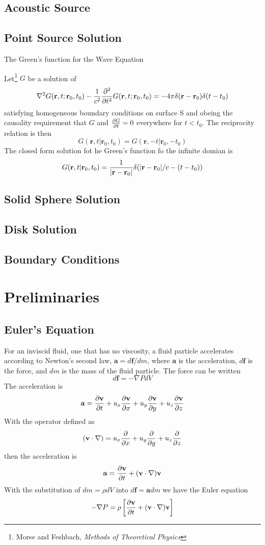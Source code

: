 \documentclass{article}
\begin{document}
\subsection{Acoustic Source}
\subsection{Point Source Solution}
The Green's function for the Wave Equation

Let\footnote{Morse and Feshbach, \textit{Methods of Theoretical Physics}}
$G$ be a solution of
$$
\nabla^2G(\mathbf{r},t; \mathbf{r}_0,t_0)-{1\over c^2}{\partial^2\over\partial t^2}G(\mathbf{r},t; \mathbf{r}_0,t_0)= -4\pi\delta(\mathbf{r}-\mathbf{r}_0)\delta(t-t_0)
$$
satisfying homogeneous boundary conditions on surface S and obeing the causality requirement that $G$ and 
${\partial G\over\partial t}=0$ everywhere for $t<t_0$.  The reciprocity relation is
then
$$
G(\mathbf{r},t\vert\mathbf{r}_0,t_0) = G(\mathbf{r},-t\vert\mathbf{r}_0,-t_0)
$$
The closed form solution fot he Green's function fo the infinite domian is
$$
G(\mathbf{r},t\vert\mathbf{r}_0,t_0) = {1\over \vert\mathbf{r}-\mathbf{r}_0\vert}\delta(\vert\mathbf{r}-\mathbf{r}_0\vert/c - (t-t_0))
$$

\subsection{Solid Sphere Solution}
\subsection{Disk Solution}
\subsection{Boundary Conditions}

\section{Preliminaries}
\subsection{Euler's Equation}
For an inviscid fluid, one that has no viscosity, a fluid particle
accelerates according to Newton's second law,
$\mathbf{a}=d\mathbf{f}/dm$, where $\mathbf{a}$ is the acceleration,
$d\mathbf{f}$ is the force, and $dm$ is the mass of the fluid particle. 
The force can be written
$$
d\mathbf{f}=-\nabla P dV
$$
The acceleration is
$$
\mathbf{a}={\partial \mathbf{v}\over \partial t} + u_x{\partial \mathbf{v}\over \partial x} + u_y\frac{\partial
\mathbf{v}}{\partial y} + u_z{\partial \mathbf{v}\over \partial z}
$$
With the operator defined as
$$
(\mathbf{v} \cdot \nabla) = u_x{\partial\over \partial x} + u_y{\partial\over \partial y} +
u_z{\partial\over \partial z}
$$
then the acceleration is
$$
\mathbf{a}={\partial \mathbf{v}\over \partial t} + (\mathbf{v} \cdot \nabla)\mathbf{v}
$$
With the substitution of $dm=\rho dV$ into $d\mathbf{f}=\mathbf{a} dm$ we have the Euler equation
$$
-\nabla P = \rho \left [ {\partial \mathbf{v}\over \partial t} + (\mathbf{v} \cdot \nabla)\mathbf{v} \right ]
$$
\end{document}
